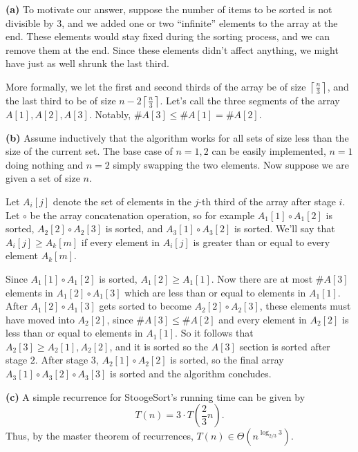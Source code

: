 \documentclass[11pt, letterpaper]{article}
\begin{document}
\begin{solution}
    \textbf{(a)} To motivate our answer, suppose the number of items to be sorted is not divisible by 3, and we added one or two ``infinite'' elements to the array at the end. These elements would stay fixed during the sorting process, and we can remove them at the end. Since these elements didn't affect anything, we might have just as well shrunk the last third.

    More formally, we let the first and second thirds of the array be of size $\left\lceil \frac{n}{3} \right\rceil$, and the last third to be of size $n-2\left\lceil \frac{n}{3} \right\rceil$. Let's call the three segments of the array $A[1], A[2], A[3]$. Notably, $\#A[3]\leq \#A[1]=\#A[2]$.  
    
    \textbf{(b)} Assume inductively that the algorithm works for all sets of size less than the size of the current set. The base case of $n=1,2$ can be easily implemented, $n=1$ doing nothing and $n=2$ simply swapping the two elements. Now suppose we are given a set of size $n$.
    
    Let $A_i[j]$ denote the set of elements in the $j$-th third of the array after stage $i$. Let $\circ$ be the array concatenation operation, so for example $A_1[1]\circ A_1[2]$ is sorted, $A_2[2]\circ A_2[3]$ is sorted, and $A_3[1]\circ A_3[2]$ is sorted. We'll say that $A_i[j] \geq A_k[m]$ if every element in $A_i[j]$ is greater than or equal to every element $A_k[m]$. 

    Since $A_1[1]\circ A_1[2]$ is sorted, $A_1[2]\geq A_1[1]$. Now there are at most $\#A[3]$ elements in $A_1[2]\circ A_1[3]$ which are less than or equal to elements in $A_1[1]$. After $A_1[2]\circ A_1[3]$ gets sorted to become $A_2[2]\circ A_2[3]$, these elements must have moved into $A_2[2]$, since $\#A[3]\leq \#A[2]$ and every element in $A_2[2]$ is less than or equal to elements in $A_1[1]$. So it follows that $A_2[3] \geq A_2[1], A_2[2]$, and it is sorted so the $A[3]$ section is sorted after stage $2$. After stage $3$, $A_2[1]\circ A_2[2]$ is sorted, so the final array $A_3[1]\circ A_3[2]\circ A_3[3]$ is sorted and the algorithm concludes.                 
    
    \textbf{(c)} A simple recurrence for StoogeSort's running time can be given by
    \[
        T(n)=3\cdot T\left(\frac{2}{3}n\right)
    .\]  
    Thus, by the master theorem of recurrences, $T(n)\in \Theta\left(n^{\log_{2 /3} 3}\right)$.
\end{solution}
\end{document}
